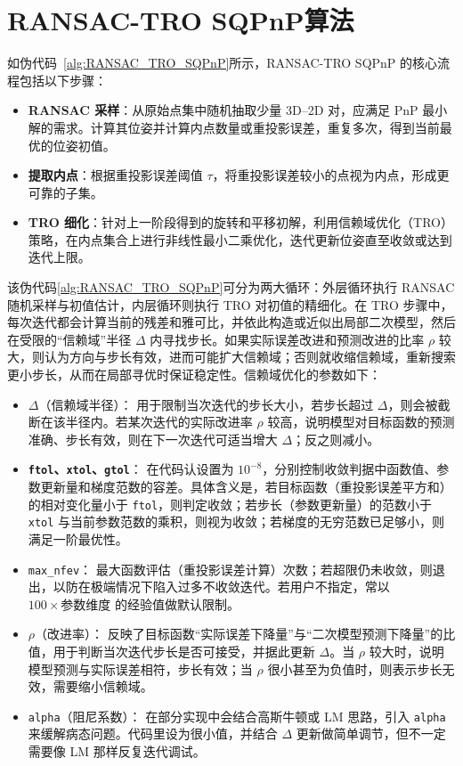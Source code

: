 \section{RANSAC-TRO SQPnP算法}
\label{sec:RANSAC-TRO-SQPnP:Algorithm}

如伪代码~\ref{alg:RANSAC_TRO_SQPnP}所示，RANSAC-TRO SQPnP 的核心流程包括以下步骤：
\begin{itemize}
	\item \textbf{RANSAC 采样}：从原始点集中随机抽取少量 3D--2D 对，应满足 PnP 最小解的需求。计算其位姿并计算内点数量或重投影误差，重复多次，得到当前最优的位姿初值。
	\item \textbf{提取内点}：根据重投影误差阈值 $\tau$，将重投影误差较小的点视为内点，形成更可靠的子集。
	\item \textbf{TRO 细化}：针对上一阶段得到的旋转和平移初解，利用信赖域优化（TRO）策略，在内点集合上进行非线性最小二乘优化，迭代更新位姿直至收敛或达到迭代上限。
\end{itemize}

该伪代码\autoref{alg:RANSAC_TRO_SQPnP}可分为两大循环：外层循环执行 RANSAC 随机采样与初值估计，内层循环则执行 TRO 对初值的精细化。在 TRO 步骤中，每次迭代都会计算当前的残差和雅可比，并依此构造或近似出局部二次模型，然后在受限的“信赖域”半径 $\Delta$ 内寻找步长。如果实际误差改进和预测改进的比率 $\rho$ 较大，则认为方向与步长有效，进而可能扩大信赖域；否则就收缩信赖域，重新搜索更小步长，从而在局部寻优时保证稳定性。信赖域优化的参数如下：
\begin{itemize}
	\item \textbf{$\Delta$}（信赖域半径）：
	用于限制当次迭代的步长大小，若步长超过 $\Delta$，则会被截断在该半径内。若某次迭代的实际改进率 $\rho$ 较高，说明模型对目标函数的预测准确、步长有效，则在下一次迭代可适当增大 $\Delta$；反之则减小。
	
	\item \textbf{\texttt{ftol}、\texttt{xtol}、\texttt{gtol}}：
	在代码认设置为 $10^{-8}$，分别控制收敛判据中函数值、参数更新量和梯度范数的容差。具体含义是，若目标函数（重投影误差平方和）的相对变化量小于 \texttt{ftol}，则判定收敛；若步长（参数更新量）的范数小于 \texttt{xtol} 与当前参数范数的乘积，则视为收敛；若梯度的无穷范数已足够小，则满足一阶最优性。
	
	\item \texttt{max\_nfev}：
	最大函数评估（重投影误差计算）次数；若超限仍未收敛，则退出，以防在极端情况下陷入过多不收敛迭代。若用户不指定，常以 $100\times\text{参数维度}$ 的经验值做默认限制。
	
	\item $\rho$（改进率）：
	反映了目标函数“实际误差下降量”与“二次模型预测下降量”的比值，用于判断当次迭代步长是否可接受，并据此更新 $\Delta$。当 $\rho$ 较大时，说明模型预测与实际误差相符，步长有效；当 $\rho$ 很小甚至为负值时，则表示步长无效，需要缩小信赖域。
	
	\item \texttt{alpha}（阻尼系数）：
	在部分实现中会结合高斯牛顿或 LM 思路，引入 \texttt{alpha} 来缓解病态问题。代码里设为很小值，并结合 $\Delta$ 更新做简单调节，但不一定需要像 LM 那样反复迭代调试。
\end{itemize}


